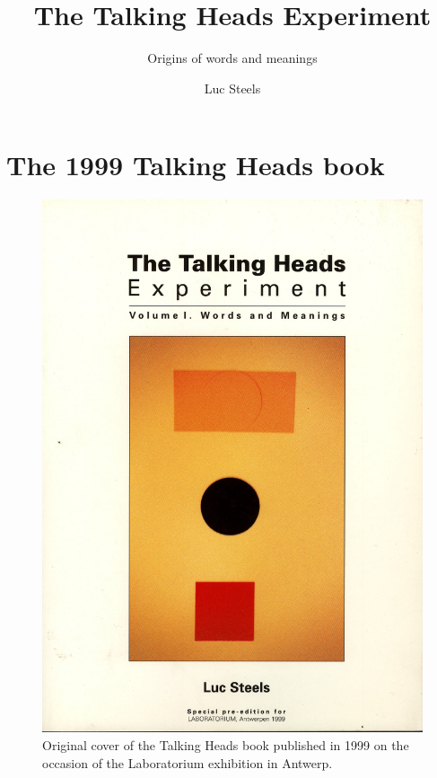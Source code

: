 \documentclass[ number=1
			   ,series=cmle
			   ,url=http://langsci-press.org/ 
			   ,isbn=978-3-944675-42-8
			   ,output=short   %
			   ,smallfont
			   ,biblatex
			   ,draftmode  
			  ]{LSP/langsci}
\title{The Talking Heads Experiment}
\subtitle{Origins of words and meanings}
\author{Luc Steels}
\begin{document}
 


\maketitle                
\frontmatter

\tableofcontents    

\mainmatter 

\part{The 1999 Talking Heads book} \label{part:1}

\begin{figure}[htbp]
  \centerline{\includegraphics[width=.95\textwidth]{extra/figs/cover-original-book.pdf}}
\caption{\small\label{left-right} Original cover of the Talking Heads book published in 1999 on the occasion of the 
Laboratorium exhibition in Antwerp.}
\label{f:cover}
\end{figure}
%







%
\end{document}
